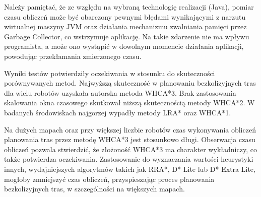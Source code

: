 Należy pamiętać, że ze względu na wybraną technologię realizacji (Java), pomiar czasu obliczeń może być obarczony pewnymi błędami wynikającymi z narzutu wirtualnej maszyny JVM oraz działania mechanizmu zwalniania pamięci przez Garbage Collector, co wstrzymuje aplikację.
Na takie zdarzenie nie ma wpływu programista, a może ono wystąpić w dowolnym momencie działania aplikacji, powodując przekłamania zmierzonego czasu.

Wyniki testów potwierdziły oczekiwania w stosunku do skuteczności porównywanych metod.
Najwyższą skuteczność w planowaniu bezkolizyjnych tras dla wielu robotów uzyskała autorska metoda WHCA*3.
Brak zastosowania skalowania okna czasowego skutkował niższą skutecznością metody WHCA*2.
W badanych środowiskach najgorzej wypadły metody LRA* oraz WHCA*1.


Na dużych mapach oraz przy większej liczbie robotów czas wykonywania obliczeń planowania tras przez metodę WHCA*3 jest stosunkowo długi.
Obserwacja czasu obliczeń pozwala stwierdzić, że złożoność WHCA*3 ma charakter wykładniczy, co także potwierdza oczekiwania.
Zastosowanie do wyznaczania wartości heurystyki innych, wydajniejszych algorytmów takich jak RRA*, D* Lite lub D* Extra Lite, mogłoby zmniejszyć czas obliczeń, przyspieszając proces planowania bezkolizyjnych tras, w szczególności na większych mapach.


